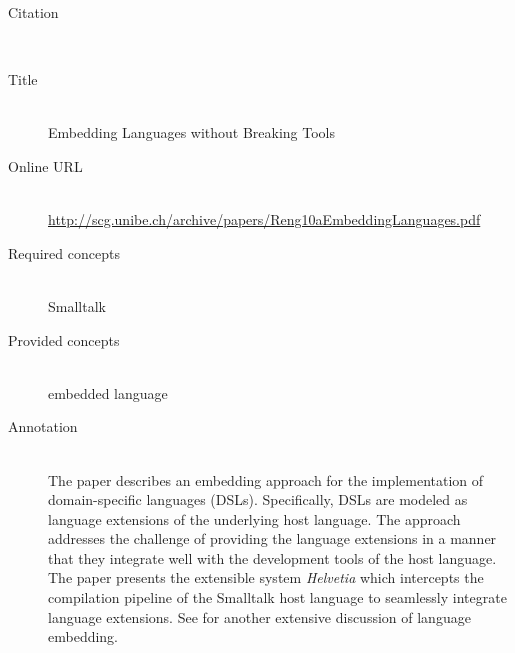 \begin{description}
\item[Citation]\mbox{}\\
\cite{RenggliGN10}
\item[Title]\mbox{}\\
Embedding Languages without Breaking Tools
\item[Online URL]\mbox{}\\
{\footnotesize\url{http://scg.unibe.ch/archive/papers/Reng10aEmbeddingLanguages.pdf}}
\item[Required concepts]\mbox{}\\
Smalltalk\item[Provided concepts]\mbox{}\\
embedded language\item[Annotation]\mbox{}\\
The paper describes an embedding approach for the implementation of domain-specific languages (DSLs). Specifically, DSLs are modeled as language extensions of the underlying host language. The approach addresses the challenge of providing the language extensions in a manner that they integrate well with the development tools of the host language. The paper presents the extensible system \emph{Helvetia} which intercepts the compilation pipeline of the Smalltalk host language to seamlessly integrate language extensions. See \cite{Tratt08} for another extensive discussion of language embedding.
\end{description}


